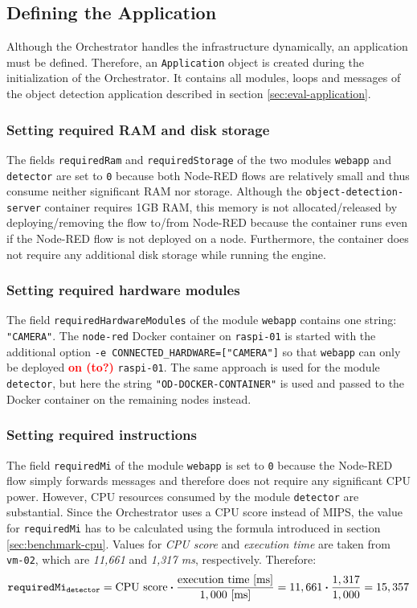 \subsection{Defining the Application\label{sec:eval-defining-application}}

Although the Orchestrator handles the infrastructure dynamically, an application must be defined. 
Therefore, an \texttt{Application} object is created during the initialization of the Orchestrator.
It contains all modules, loops and messages of the object detection application described in section \ref{sec:eval-application}.

\subsubsection*{Setting required RAM and disk storage}
The fields \texttt{requiredRam} and \texttt{requiredStorage} of the two modules \texttt{webapp} and \texttt{detector} are set to \texttt{0} because both Node-RED flows are relatively small and thus consume neither significant RAM nor storage.
Although the \texttt{object-detection-server} container requires 1GB RAM, this memory is not allocated/released by deploying/removing the flow to/from Node-RED because the container runs even if the Node-RED flow is not deployed on a node.
Furthermore, the container does not require any additional disk storage while running the engine.

\subsubsection*{Setting required hardware modules}
The field \texttt{requiredHardwareModules} of the module \texttt{webapp} contains one string: \texttt{"CAMERA"}.
The \texttt{node-red} Docker container on \texttt{raspi-01} is started with the additional option \texttt{-e CONNECTED\_HARDWARE=["CAMERA"]} so that \texttt{webapp} can only be deployed \textcolor{red}{\textbf{on (to?)}} \texttt{raspi-01}. The same approach is used for the module \texttt{detector}, but here the string \texttt{"OD-DOCKER-CONTAINER"} is used and passed to the Docker container on the remaining nodes instead.

\subsubsection*{Setting required instructions}
The field \texttt{requiredMi} of the module \texttt{webapp} is set to \texttt{0} because the Node-RED flow simply forwards messages and therefore does not require any significant CPU power.
However, CPU resources consumed by the module \texttt{detector} are substantial.
Since the Orchestrator uses a CPU score instead of MIPS, the value for \texttt{requiredMi} has to be calculated using the formula introduced in section \ref{sec:benchmark-cpu}.
Values for \textit{CPU score} and \textit{execution time} are taken from \texttt{vm-02}, which are \textit{11,661} and \textit{1,317 ms}, respectively.
Therefore:
\[\textrm{\texttt{requiredMi\textsubscript{detector}}} = \textrm{CPU score} \boldsymbol{\cdot} \frac{\textrm{execution time [ms]}}{1,000 \textrm{ [ms]}} = 11,661 \boldsymbol{\cdot} \frac{1,317}{1,000} = 15,357\]

